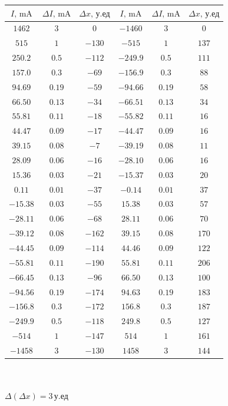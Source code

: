 \begin{center}
\begin{tabular}{|c|c|c|c|c|c|}\hline
$I\text{, mA}$&$\Delta I\text{, mA}$&$\Delta x\text{, у.ед}$&$I\text{, mA}$&$\Delta I\text{, mA}$&$\Delta x\text{, у.ед}$\\\hline
$1462$&$3$&$0$&$-1460$&$3$&$0$\\\hline
$515$&$1$&$-130$&$-515$&$1$&$137$\\\hline
$250.2$&$0.5$&$-112$&$-249.9$&$0.5$&$111$\\\hline
$157.0$&$0.3$&$-69$&$-156.9$&$0.3$&$88$\\\hline
$94.69$&$0.19$&$-59$&$-94.66$&$0.19$&$58$\\\hline
$66.50$&$0.13$&$-34$&$-66.51$&$0.13$&$34$\\\hline
$55.81$&$0.11$&$-18$&$-55.82$&$0.11$&$16$\\\hline
$44.47$&$0.09$&$-17$&$-44.47$&$0.09$&$16$\\\hline
$39.15$&$0.08$&$-7$&$-39.19$&$0.08$&$11$\\\hline
$28.09$&$0.06$&$-16$&$-28.10$&$0.06$&$16$\\\hline
$15.36$&$0.03$&$-21$&$-15.37$&$0.03$&$20$\\\hline
$0.11$&$0.01$&$-37$&$-0.14$&$0.01$&$37$\\\hline
$-15.38$&$0.03$&$-55$&$15.38$&$0.03$&$57$\\\hline
$-28.11$&$0.06$&$-68$&$28.11$&$0.06$&$70$\\\hline
$-39.12$&$0.08$&$-162$&$39.15$&$0.08$&$170$\\\hline
$-44.45$&$0.09$&$-114$&$44.46$&$0.09$&$122$\\\hline
$-55.81$&$0.11$&$-190$&$55.81$&$0.11$&$206$\\\hline
$-66.45$&$0.13$&$-96$&$66.50$&$0.13$&$100$\\\hline
$-94.56$&$0.19$&$-174$&$94.63$&$0.19$&$183$\\\hline
$-156.8$&$0.3$&$-172$&$156.8$&$0.3$&$187$\\\hline
$-249.9$&$0.5$&$-118$&$249.8$&$0.5$&$127$\\\hline
$-514$&$1$&$-147$&$514$&$1$&$161$\\\hline
$-1458$&$3$&$-130$&$1458$&$3$&$144$\\\hline
\end{tabular}\\~\\
$\Delta (\Delta x)=3\,\text{у.ед}$
\end{center}


